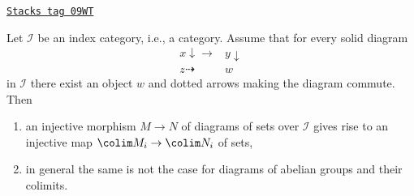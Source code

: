 \begin{lemma}
\label{categories-lemma-preserve-injective-maps}
\href{https://stacks.math.columbia.edu/tag/09WT}{\texttt{Stacks tag 09WT}}

Let $\mathcal{I}$ be an index category, i.e., a category. Assume
that for every solid diagram
$$
\begin{array}{cc}x \downarrow\longrightarrow & y \downarrow \\ z \dashrightarrow & w\end{array}
$$
in $\mathcal{I}$ there exist an object $w$ and dotted arrows
making the diagram commute. Then
\begin{enumerate}
\item an injective morphism $M \to N$ of diagrams of sets over
$\mathcal{I}$ gives rise to an injective map $\colim M_i \to \colim N_i$
of sets,
\item in general the same is not the case for diagrams of abelian
groups and their colimits.
\end{enumerate}
\end{lemma}

